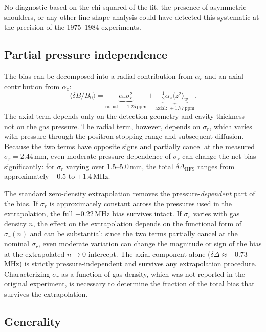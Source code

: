 \documentclass[twocolumn,pra,aps,superscriptaddress,floatfix,10pt]{revtex4-2}
\begin{document}
No diagnostic based on the chi-squared of the fit, the presence of asymmetric shoulders, or any other line-shape analysis could have detected this systematic at the precision of the 1975--1984 experiments.

\subsection{Partial pressure independence}
\label{sec:pressure}

The bias can be decomposed into a radial contribution from $\alpha_r$ and an axial contribution from $\alpha_z$:
\begin{equation}
  \langle\delta B/B_0\rangle = \underbrace{\alpha_r \sigma_r^2}_{\text{radial: }-1.25\,\text{ppm}} + \underbrace{\tfrac{1}{2}\alpha_z \langle z^2\rangle_w}_{\text{axial: }+1.77\,\text{ppm}}.
  \label{eq:decomposition}
\end{equation}
The axial term depends only on the detection geometry and cavity thickness---not on the gas pressure. The radial term, however, depends on $\sigma_r$, which varies with pressure through the positron stopping range and subsequent diffusion. Because the two terms have opposite signs and partially cancel at the measured $\sigma_r = 2.44$\,mm, even moderate pressure dependence of $\sigma_r$ can change the net bias significantly: for $\sigma_r$ varying over 1.5--5.0\,mm, the total $\delta\Delta_\mathrm{HFS}$ ranges from approximately $-0.5$ to $+1.4$\,MHz.

The standard zero-density extrapolation removes the pressure-\emph{dependent} part of the bias. If $\sigma_r$ is approximately constant across the pressures used in the extrapolation, the full $-0.22$\,MHz bias survives intact. If $\sigma_r$ varies with gas density $n$, the effect on the extrapolation depends on the functional form of $\sigma_r(n)$ and can be substantial: since the two terms partially cancel at the nominal $\sigma_r$, even moderate variation can change the magnitude or sign of the bias at the extrapolated $n \to 0$ intercept. The axial component alone ($\delta\Delta \approx -0.73$\,MHz) is strictly pressure-independent and survives any extrapolation procedure. Characterizing $\sigma_r$ as a function of gas density, which was not reported in the original experiment, is necessary to determine the fraction of the total bias that survives the extrapolation.

\subsection{Generality}
\end{document}
